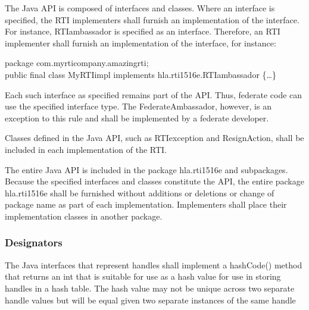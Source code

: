 \begin{compactstdpage}
    The Java API is composed of interfaces and classes. Where an interface is specified, the RTI implementers shall furnish an implementation of the interface. For instance, RTIambassador is specified as an interface. Therefore, an RTI implementer shall furnish an implementation of the interface, for instance:

        {\ttfamily\fontsize{8.7}{10}\selectfont package com.myrticompany.amazingrti;\\
    public final class MyRTIimpl implements hla.rti1516e.RTIambassador \{\ldots\}}

    Each such interface as specified remains part of the API. Thus, federate code can use the specified interface type. The FederateAmbassador, however, is an exception to this rule and shall be implemented by a federate developer.

    Classes defined in the Java API, such as RTIexception and ResignAction, shall be included in each implementation of the RTI.

    The entire Java API is included in the package hla.rti1516e and subpackages. Because the specified interfaces and classes constitute the API, the entire package hla.rti1516e shall be furnished without additions or deletions or change of package name as part of each implementation. Implementers shall place their implementation classes in another package.

    \subsubsection{Designators}

    The Java interfaces that represent handles shall implement a hashCode() method that returns an int that is suitable for use as a hash value for use in storing handles in a hash table. The hash value may not be unique across two separate handle values but will be equal given two separate instances of the same handle

\end{compactstdpage}

\clearpage

